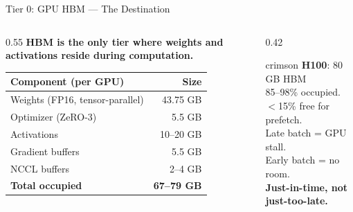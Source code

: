 \documentclass[aspectratio=169, 12pt]{beamer}
\begin{document}
\begin{frame}{Tier 0: GPU HBM --- The Destination}

\small
\begin{columns}[T]
  \begin{column}{0.55\textwidth}
    \textbf{HBM is the only tier where weights and activations reside during computation.}

    \vspace{0.1cm}
    {\footnotesize
    \renewcommand{\arraystretch}{1.15}
    \begin{tabular}{@{}lr@{}}
      \toprule
      \textbf{Component (per GPU)} & \textbf{Size} \\
      \midrule
      Weights (FP16, tensor-parallel) & 43.75 GB \\
      Optimizer (ZeRO-3)              & 5.5 GB \\
      Activations                     & 10--20 GB \\
      Gradient buffers                & 5.5 GB \\
      NCCL buffers                    & 2--4 GB \\
      \midrule
      \textbf{Total occupied}         & \textbf{67--79 GB} \\
      \bottomrule
    \end{tabular}
    }
  \end{column}
  \begin{column}{0.42\textwidth}
    \vspace{0.1cm}
    \begin{mlsyscard}{crimson}
    \textbf{H100}: 80 GB HBM\\[0.1cm]
    {\footnotesize 85--98\% occupied.\\
    $<$15\% free for prefetch.\\[0.1cm]
    Late batch = GPU stall.\\
    Early batch = no room.\\[0.1cm]
    \textbf{Just-in-time, not just-too-late.}}
    \end{mlsyscard}
  \end{column}
\end{columns}

\end{frame}
\end{document}
